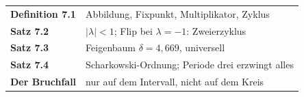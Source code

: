 \begin{merksatz}
\begin{center}
\renewcommand{\arraystretch}{1.5}
\begin{tabular}{@{}P{3.0cm}P{5.6cm}@{}}
\toprule
\textbf{Definition 7.1} & Abbildung, Fixpunkt, Multiplikator, Zyklus\\
\textbf{Satz 7.2} & $|\lambda| < 1$; Flip bei $\lambda = -1$: Zweierzyklus\\
\textbf{Satz 7.3} & Feigenbaum $\delta = 4{,}669$, universell\\
\textbf{Satz 7.4} & Scharkowski-Ordnung; Periode drei erzwingt alles\\
\textbf{Der Bruchfall} & nur auf dem Intervall, nicht auf dem Kreis\\
\bottomrule
\end{tabular}
\end{center}

\begin{center}
\begin{minipage}{0.88\textwidth}
\end{minipage}
\end{center}
\end{merksatz}
